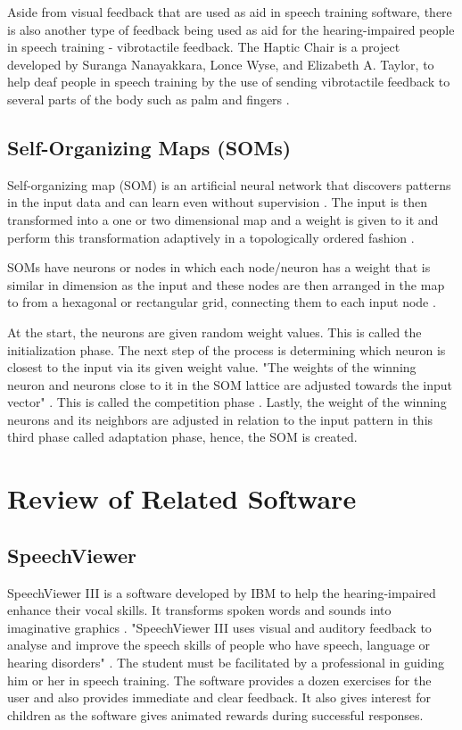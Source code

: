 Aside from visual feedback that are used as aid in speech training software, there is also another type of feedback being used as aid for the hearing-impaired people in speech training - vibrotactile feedback. The Haptic Chair is a project developed by Suranga Nanayakkara, Lonce Wyse, and Elizabeth A. Taylor, to help deaf people in speech training by the use of sending vibrotactile feedback to several parts of the body such as palm and fingers \cite{nanaya:2012:hap}.

\subsection{Self-Organizing Maps (SOMs)}

Self-organizing map (SOM) is an artificial neural network that discovers patterns in the input data and can learn even without supervision \cite{agustin:2014:SOM}. The input is then transformed into a one or two dimensional map and a weight is given to it and perform this transformation adaptively in a topologically ordered fashion \cite{chandar:2013:srs}.

SOMs have neurons or nodes in which each node/neuron has a weight that is similar in dimension as the input and these nodes are then arranged in the map to from a hexagonal or rectangular grid, connecting them to each input node \cite{agustin:2014:SOM}.

At the start, the neurons are given random weight values. This is called the initialization phase. The next step of the process is determining which neuron is closest to the input via its given weight value. "The weights of the winning neuron and neurons close to it in the SOM lattice are adjusted towards the input vector" \cite{chandar:2013:srs}. This is called the competition phase \cite{agustin:2014:SOM}. Lastly, the weight of the winning neurons and its neighbors are adjusted in relation to the input pattern in this third phase called adaptation phase, hence, the SOM is created.

\section{Review of Related Software}

\subsection{SpeechViewer}
SpeechViewer III is a software developed by IBM to help the hearing-impaired enhance their vocal skills. It transforms spoken words and sounds into imaginative graphics \cite{speechville:nd:slp}. "SpeechViewer III uses visual and auditory feedback to analyse and improve the speech skills of people who have speech, language or hearing disorders" \cite{kennedy:nd:spv}. The student must be facilitated by a professional in guiding him or her in speech training. The software provides a dozen exercises for the user and also provides immediate and clear feedback. It also gives interest for children as the software gives animated rewards during successful responses.

